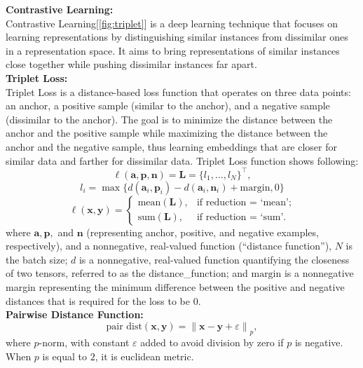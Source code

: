 \documentclass[10pt,twocolumn,letterpaper]{article}
\begin{document}
\noindent\textbf{Contrastive Learning:}\\
\indent Contrastive Learning\cite{khosla2020supervised, hermans2017defense, dong2018triplet}[\ref{fig:triplet}] is a deep learning technique that focuses on learning representations by distinguishing similar instances from dissimilar ones in a representation space. It aims to bring representations of similar instances close together while pushing dissimilar instances far apart.\\

\noindent\textbf{Triplet Loss:}\\
\indent Triplet Loss\cite{hermans2017defense, dong2018triplet} is a distance-based loss function that operates on three data points: an anchor, a positive sample (similar to the anchor), and a negative sample (dissimilar to the anchor). The goal is to minimize the distance between the anchor and the positive sample while maximizing the distance between the anchor and the negative sample\cite{hermans2017defense, dong2018triplet}, thus learning embeddings that are closer for similar data and farther for dissimilar data.
Triplet Loss function shows following:
\[\ell(\mathbf{a},\mathbf{p},\mathbf{n}) = \mathbf{L} = \{l_1, \ldots, l_N\}^\top,\]
\[l_i = \max \{d(\mathbf{a}_i, \mathbf{p}_i) - d(\mathbf{a}_i, \mathbf{n}_i) + \text{margin}, 0\}\]
\[
\ell(\mathbf{x},\mathbf{y}) = 
\begin{cases} 
\text{mean}(\mathbf{L}), & \text{if reduction = `mean';} \\
\text{sum}(\mathbf{L}), & \text{if reduction = `sum'}.
\end{cases}
\]
where \( \mathbf{a}, \mathbf{p}, \) and \( \mathbf{n} \) (representing anchor, positive, and negative examples, respectively), and a nonnegative, real-valued function (“distance function”), \( N \) is the batch size; \( d \) is a nonnegative, real-valued function quantifying the closeness of two tensors, referred to as the distance\_function; and \( \text{margin} \) is a nonnegative margin representing the minimum difference between the positive and negative distances that is required for the loss to be 0.\\

\noindent\textbf{Pairwise Distance Function:}\\
\[
\text{pair dist}(\mathbf{x}, \mathbf{y}) = \left\| \mathbf{x} - \mathbf{y} + \varepsilon \right\|_p,
\]
where \( p \)-norm, with constant \( \varepsilon \) added to avoid division by zero if \( p \) is negative. When \( p \) is equal to \( 2 \), it is euclidean metric.\\
\end{document}
